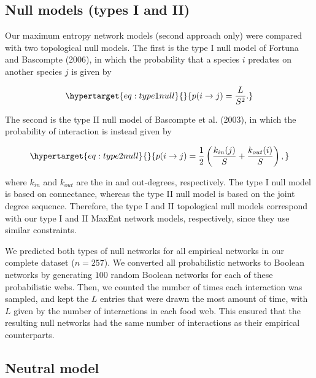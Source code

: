 \documentclass[11pt]{article}
\begin{document}
\hypertarget{null-models-types-i-and-ii}{%
\subsection{Null models (types I and
II)}\label{null-models-types-i-and-ii}}

Our maximum entropy network models (second approach only) were compared
with two topological null models. The first is the type I null model of
Fortuna and Bascompte (2006), in which the probability that a species
\(i\) predates on another species \(j\) is given by

\begin{equation}\protect\hypertarget{eq:type1null}{}{p(i \rightarrow j) = \frac{L}{S^2}.}\label{eq:type1null}\end{equation}

The second is the type II null model of Bascompte et al. (2003), in
which the probability of interaction is instead given by

\begin{equation}\protect\hypertarget{eq:type2null}{}{p(i \rightarrow j) = \frac{1}{2} \left(\frac{k_{in}(j)}{S} + \frac{k_{out}(i)}{S}\right),}\label{eq:type2null}\end{equation}

where \(k_{in}\) and \(k_{out}\) are the in and out-degrees,
respectively. The type I null model is based on connectance, whereas the
type II null model is based on the joint degree sequence. Therefore, the
type I and II topological null models correspond with our type I and II
MaxEnt network models, respectively, since they use similar constraints.

We predicted both types of null networks for all empirical networks in
our complete dataset (\(n = 257\)). We converted all probabilistic
networks to Boolean networks by generating \(100\) random Boolean
networks for each of these probabilistic webs. Then, we counted the
number of times each interaction was sampled, and kept the \(L\) entries
that were drawn the most amount of time, with \(L\) given by the number
of interactions in each food web. This ensured that the resulting null
networks had the same number of interactions as their empirical
counterparts.

\hypertarget{neutral-model}{%
\subsection{Neutral model}\label{neutral-model}}
\end{document}
